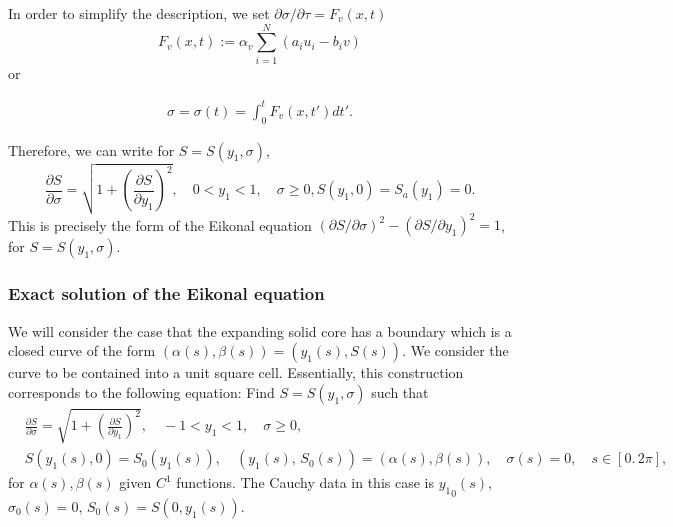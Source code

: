 \documentclass[reqno, 11pt]{amsart}
\numberwithin{equation}{section}
\newcommand{\ee}{{\mathrm{e}}}
\def\be{\begin{equation}}
\def\ee{\end{equation}}
\def\bse{\begin{subequations}}
\def\ese{\end{subequations}}
\newcommand{\clr}{\color{red}}
\begin{document}
In order to simplify the description, we set ${\partial \sigma}/{\partial \tau}=F_v(x,t)$
 \[F_v(x,t):=\alpha_v \sum_{i=1}^N\left(a_i u_i- b_i v\right)\]
 or

\begin{eqnarray} 
\sigma=\sigma(t)=\int_0^{t} F_v(x,t')dt'. \label{trnsf}
\end{eqnarray}

 Therefore, we can write for $S=S(y_1,\sigma)$,
 \bse
 \label{eqS3}
 \be  \label{eqS3a}
 \frac{\partial S}{\partial\sigma} =
 \sqrt{1+ \left(\frac{\partial S}{\partial y_1}\right)^2},\quad 0<y_1<1,\quad \sigma\geq 0,
 \ee
 \be
\label{eqS3b}
  S(y_1, 0)=S_a(y_1)=0.
\ee
 \ese
This is precisely the form of the Eikonal equation $\left({\partial S }/{\partial \sigma}\right)^2
-\left({\partial S }/{\partial y_1}\right)^2=1$, for $S=S(y_1,\sigma)$.


\subsubsection{Exact solution of the Eikonal equation}\label{SecEikSol}
We will consider the case  that the expanding solid core has a boundary which is a  closed curve  of
the form  $(\alpha(s), \beta(s))=(y_1(s), S(s))$. We consider the curve to be contained into a  unit square cell. %
Essentially, 
this construction corresponds to the following equation:  Find $S=S(y_1,\sigma)$ such that 
\begin{eqnarray}\label{eqSsq}
& \frac{\partial S}{\partial\sigma} =
 \sqrt{1+ \left(\frac{\partial S}{\partial y_1}\right)^2},\quad -1<y_1<1,\quad \sigma\geq 0,\\
&      S(y_1(s),0)=S_0 (y_1(s)),\quad  (y_1(s), \, S_0(s))=(\alpha(s), \beta(s)),  \quad   \sigma(s)=0,\quad     s\in [0.\,2\pi],
\end{eqnarray}
for $\alpha(s), \beta(s)$ given $C^1$ functions. The Cauchy data in this case is ${y_1}_0(s)$, $\sigma_0(s)=0$,
$S_0(s)=S(0,y_1(s))$.
\end{document}
